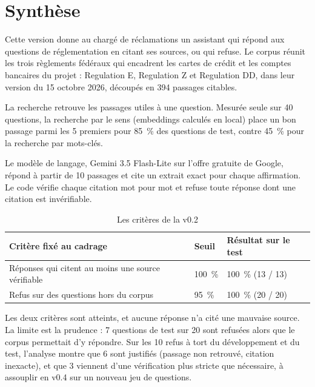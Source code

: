 \documentclass[11pt,a4paper]{article}
\begin{document}

\section*{Synthèse}

Cette version donne au chargé de réclamations un assistant qui répond aux questions de réglementation en citant ses sources, ou qui refuse. Le corpus réunit les trois règlements fédéraux qui encadrent les cartes de crédit et les comptes bancaires du projet : Regulation E, Regulation Z et Regulation DD, dans leur version du 15 octobre 2026, découpés en 394 passages citables.

La recherche retrouve les passages utiles à une question. Mesurée seule sur 40 questions, la recherche par le sens (embeddings calculés en local) place un bon passage parmi les 5 premiers pour 85~\% des questions de test, contre 45~\% pour la recherche par mots-clés.

Le modèle de langage, Gemini 3.5 Flash-Lite sur l'offre gratuite de Google, répond à partir de 10 passages et cite un extrait exact pour chaque affirmation. Le code vérifie chaque citation mot pour mot et refuse toute réponse dont une citation est invérifiable.

\begin{table}[H]
\centering\small
\begin{tabularx}{\linewidth}{@{}Y l l@{}}
\toprule
Critère fixé au cadrage & Seuil & Résultat sur le test \\
\midrule
Réponses qui citent au moins une source vérifiable & 100~\% & 100~\% (13 / 13) \\
Refus sur des questions hors du corpus & 95~\% & 100~\% (20 / 20) \\
\bottomrule
\end{tabularx}
\caption{Les critères de la v0.2}
\end{table}

Les deux critères sont atteints, et aucune réponse n'a cité une mauvaise source. La limite est la prudence : 7 questions de test sur 20 sont refusées alors que le corpus permettait d'y répondre. Sur les 10 refus à tort du développement et du test, l'analyse montre que 6 sont justifiés (passage non retrouvé, citation inexacte), et que 3 viennent d'une vérification plus stricte que nécessaire, à assouplir en v0.4 sur un nouveau jeu de questions.
\end{document}
